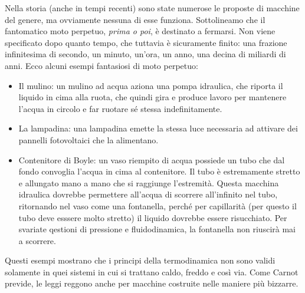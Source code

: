 Nella storia (anche in tempi recenti) sono state numerose le proposte
di macchine del genere, ma ovviamente nessuna di esse funziona.
Sottolineamo che il fantomatico moto perpetuo, \emph{prima o poi}, è
destinato a fermarsi. Non viene specificato dopo quanto tempo, che tuttavia
è sicuramente finito: una frazione infinitesima di secondo, un minuto,
un'ora, un anno, una decina di miliardi di anni.
Ecco alcuni esempi fantasiosi di moto perpetuo:

\begin{itemize}
    \item Il mulino: un mulino ad acqua aziona una pompa idraulica,
    che riporta il liquido in cima alla ruota, che quindi gira e
    produce lavoro per mantenere l'acqua in circolo e far ruotare
    sé stessa indefinitamente.

    \item La lampadina: una lampadina emette la stessa luce necessaria
    ad attivare dei pannelli fotovoltaici che la alimentano.

    \item Contenitore di Boyle: un vaso riempito di acqua possiede
    un tubo che dal fondo convoglia l'acqua in cima al contenitore.
    Il tubo è estremamente stretto e allungato mano a mano che si
    raggiunge l'estremità. Questa macchina idraulica dovrebbe permettere
    all'acqua di scorrere all'infinito nel tubo, ritornando nel
    vaso come una fontanella, perché per capillarità (per questo il tubo deve esssere molto
    stretto) il liquido dovrebbe essere risucchiato. Per svariate
    qestioni di pressione e fluidodinamica, la fontanella non
    riuscirà mai a scorrere.
\end{itemize}

Questi esempi mostrano che i principi della termodinamica non
sono validi solamente in quei sistemi in cui si trattano caldo,
freddo e così via. Come Carnot previde, le leggi reggono anche
per macchine costruite nelle maniere più bizzarre.